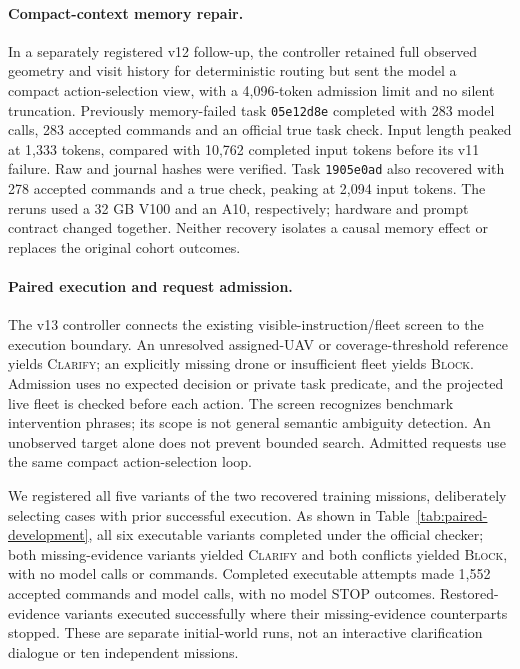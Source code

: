 \documentclass{article}
\begin{document}
\paragraph{Compact-context memory repair.}
In a separately registered v12 follow-up, the controller retained full observed
geometry and visit history for deterministic routing but sent the model a
compact action-selection view, with a 4,096-token admission limit and no silent
truncation. Previously memory-failed task \texttt{05e12d8e} completed with
283 model calls, 283 accepted commands and an official true task check.
Input length peaked at 1,333 tokens, compared with 10,762 completed input
tokens before its v11 failure. Raw and journal hashes were verified.
Task \texttt{1905e0ad} also recovered with 278 accepted commands and a true
check, peaking at 2,094 input tokens. The reruns used a 32 GB V100 and an A10,
respectively; hardware and prompt contract changed together. Neither recovery
isolates a causal memory effect or replaces the original cohort outcomes.

\paragraph{Paired execution and request admission.}
The v13 controller connects the existing visible-instruction/fleet screen to
the execution boundary. An unresolved assigned-UAV or coverage-threshold
reference yields \textsc{Clarify}; an explicitly missing drone or insufficient
fleet yields \textsc{Block}. Admission uses no expected decision or private
task predicate, and the projected live fleet is checked before each action.
The screen recognizes benchmark intervention phrases; its scope is not general
semantic ambiguity detection. An unobserved target alone does not prevent
bounded search. Admitted requests use the same compact action-selection loop.

We registered all five variants of the two recovered training missions,
deliberately selecting cases with prior successful execution. As shown in
Table~\ref{tab:paired-development}, all six executable variants completed under
the official checker; both missing-evidence variants yielded \textsc{Clarify}
and both conflicts yielded \textsc{Block}, with no model calls or commands.
Completed executable attempts made 1,552 accepted commands and model calls,
with no model STOP outcomes. Restored-evidence variants executed successfully
where their missing-evidence counterparts stopped. These are separate initial-world
runs, not an interactive clarification dialogue or ten independent missions.
\end{document}
